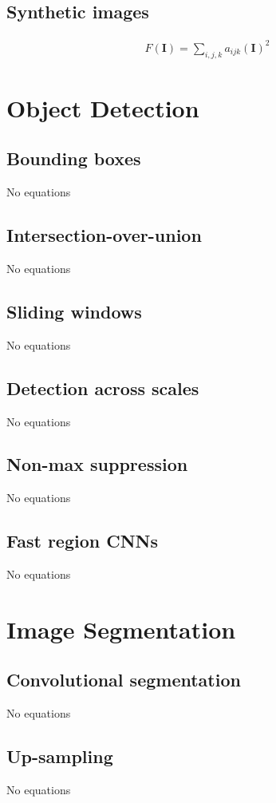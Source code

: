 \documentclass{article}
\begin{document}
\subsection{Synthetic images}
\begin{align*}
F(\mathbf{I}) = \sum_{i, j, k} a_{i j k}(\mathbf{I})^{2} \tag{10.12}
\end{align*}

\section{Object Detection}

\subsection{Bounding boxes}
No equations

\subsection{Intersection-over-union}
No equations

\subsection{Sliding windows}
No equations

\subsection{Detection across scales}
No equations

\subsection{Non-max suppression}
No equations

\subsection{Fast region CNNs}
No equations

\section{Image Segmentation}

\subsection{Convolutional segmentation}
No equations

\subsection{Up-sampling}
No equations
\end{document}
